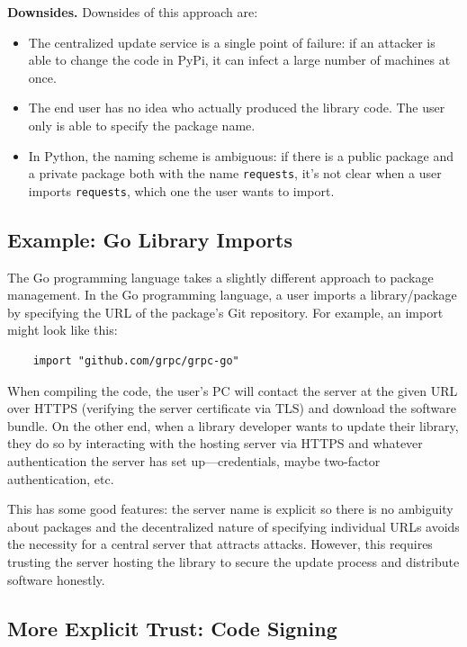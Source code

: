 \documentclass[
  letterpaper,
]{scrbook}
\providecommand{\tightlist}{%
  \setlength{\itemsep}{0pt}\setlength{\parskip}{0pt}}
\theoremstyle{definition}
\theoremstyle{plain}
\theoremstyle{plain}
\theoremstyle{remark}
\begin{document}
\textbf{Downsides.} Downsides of this approach are:

\begin{itemize}
\tightlist
\item
  The centralized update service is a single point of failure: if an
  attacker is able to change the code in PyPi, it can infect a large
  number of machines at once.
\item
  The end user has no idea who actually produced the library code. The
  user only is able to specify the package name.
\item
  In Python, the naming scheme is ambiguous: if there is a public
  package and a private package both with the name \texttt{requests},
  it's not clear when a user imports \texttt{requests}, which one the
  user wants to import.
\end{itemize}

\subsection{Example: Go Library
Imports}\label{example-go-library-imports}

The Go programming language takes a slightly different approach to
package management. In the Go programming language, a user imports a
library/package by specifying the URL of the package's Git repository.
For example, an import might look like this:

\begin{verbatim}
    import "github.com/grpc/grpc-go"
\end{verbatim}

When compiling the code, the user's PC will contact the server at the
given URL over HTTPS (verifying the server certificate via TLS) and
download the software bundle. On the other end, when a library developer
wants to update their library, they do so by interacting with the
hosting server via HTTPS and whatever authentication the server has set
up---credentials, maybe two-factor authentication, etc.

This has some good features: the server name is explicit so there is no
ambiguity about packages and the decentralized nature of specifying
individual URLs avoids the necessity for a central server that attracts
attacks. However, this requires trusting the server hosting the library
to secure the update process and distribute software honestly.

\subsection{More Explicit Trust: Code
Signing}\label{more-explicit-trust-code-signing}
\end{document}
